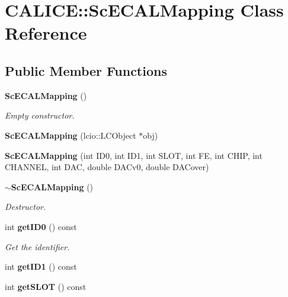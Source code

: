 \section{CALICE::ScECALMapping Class Reference}
\label{classCALICE_1_1ScECALMapping}
\subsection*{Public Member Functions}
\begin{DoxyCompactItemize}
\item 
{\bf ScECALMapping} ()\label{classCALICE_1_1ScECALMapping_ae44ea6c16a16616becda36cca3fdffc6}

\begin{DoxyCompactList}\small\item\em Empty constructor. \item\end{DoxyCompactList}\item 
{\bfseries ScECALMapping} (lcio::LCObject $\ast$obj)\label{classCALICE_1_1ScECALMapping_a24f94a3f3b6e97dc7b34243f37e1a641}

\item 
{\bfseries ScECALMapping} (int ID0, int ID1, int SLOT, int FE, int CHIP, int CHANNEL, int DAC, double DACv0, double DACover)\label{classCALICE_1_1ScECALMapping_a264bec0176d1aa28b09e77d434a648fe}

\item 
{\bf $\sim$ScECALMapping} ()\label{classCALICE_1_1ScECALMapping_a48f17616abd6ad79c8a3eb70ffa45ba6}

\begin{DoxyCompactList}\small\item\em Destructor. \item\end{DoxyCompactList}\item 
int {\bf getID0} () const \label{classCALICE_1_1ScECALMapping_a93709eafceac8b30611894a05da81452}

\begin{DoxyCompactList}\small\item\em Get the identifier. \item\end{DoxyCompactList}\item 
int {\bfseries getID1} () const \label{classCALICE_1_1ScECALMapping_a8e84695f1f34c58263697c8dfbf2b6fd}

\item 
int {\bfseries getSLOT} () const \label{classCALICE_1_1ScECALMapping_a5dafddd8602381312ee5eef23d2caef6}


\end{DoxyCompactItemize}
